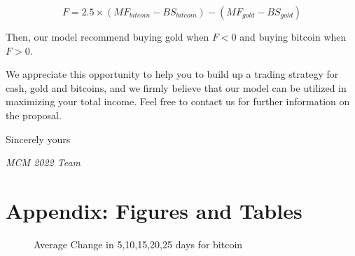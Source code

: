 \documentclass[12pt,a4paper]{article}
\begin{document}
\begin{spacing}{1.2}
\begin{enumerate}
	$$
	F=2.5 \times (MF_{bitcoin}-BS_{bitcoin})-(MF_{gold}-BS_{gold})
	$$
	
	Then, our model recommend buying gold when $F<0$ and buying bitcoin when $F>0$.
\end{enumerate}

We appreciate this opportunity to help you to build up a trading strategy for cash, gold and bitcoins, and we firmly believe that our model can be utilized in maximizing your total income. Feel free to contact us for further information on the proposal.

Sincerely yours

\textit{MCM 2022 Team}



\end{spacing}


\newpage
\appendix
\addtocounter{page}{-1}
\thispagestyle{empty}

\section*{Appendix: Figures and Tables}
\label{sec:AppendixFT}

\begin{figure}[H]
	\caption{ Average Change in 5,10,15,20,25 days for bitcoin}
	\label{figure:bitcoin_ac}
\end{figure}
\end{document}
